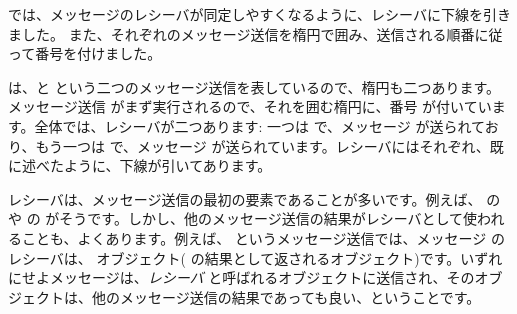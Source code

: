 \documentclass[a4paper,10pt,twoside]{book}
\begin{document}


 では、メッセージのレシーバが同定しやすくなるように、レシーバに下線を引きました。
また、それぞれのメッセージ送信を楕円で囲み、送信される順番に従って番号を付けました。


 は、と  という二つのメッセージ送信を表しているので、楕円も二つあります。メッセージ送信  がまず実行されるので、それを囲む楕円に、番号  が付いています。全体では、レシーバが二つあります: 一つは  で、メッセージ  が送られており、もう一つは  で、メッセージ  が送られています。レシーバにはそれぞれ、既に述べたように、下線が引いてあります。

レシーバは、メッセージ送信の最初の要素であることが多いです。例えば、 の  や  の  がそうです。しかし、他のメッセージ送信の結果がレシーバとして使われることも、よくあります。例えば、 というメッセージ送信では、メッセージ  のレシーバは、 オブジェクト( の結果として返されるオブジェクト)です。いずれにせよメッセージは、\emph{レシーバ} と呼ばれるオブジェクトに送信され、そのオブジェクトは、他のメッセージ送信の結果であっても良い、ということです。
\end{document}
